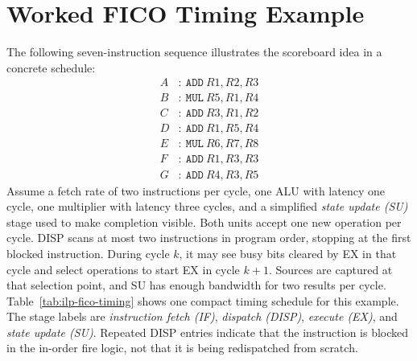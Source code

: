 \section{Worked FICO Timing Example}\label{sec:ilp-fico-example}
The following seven-instruction sequence illustrates the scoreboard idea in a concrete schedule:
\begin{align*}
    A&:\ \texttt{ADD}\ R1,R2,R3 \\
    B&:\ \texttt{MUL}\ R5,R1,R4 \\
    C&:\ \texttt{ADD}\ R3,R1,R2 \\
    D&:\ \texttt{ADD}\ R1,R5,R4 \\
    E&:\ \texttt{MUL}\ R6,R7,R8 \\
    F&:\ \texttt{ADD}\ R1,R3,R3 \\
    G&:\ \texttt{ADD}\ R4,R3,R5
\end{align*}
Assume a fetch rate of two instructions per cycle, one ALU with latency one cycle, one multiplier with latency three cycles, and a simplified \textit{state update (SU)} stage used to make completion visible.
Both units accept one new operation per cycle.
DISP scans at most two instructions in program order, stopping at the first blocked instruction.
During cycle $k$, it may see busy bits cleared by EX in that cycle and select operations to start EX in cycle $k+1$.
Sources are captured at that selection point, and SU has enough bandwidth for two results per cycle.
Table~\ref{tab:ilp-fico-timing} shows one compact timing schedule for this example.
The stage labels are \textit{instruction fetch (IF)}, \textit{dispatch (DISP)}, \textit{execute (EX)}, and \textit{state update (SU)}.
Repeated DISP entries indicate that the instruction is blocked in the in-order fire logic, not that it is being redispatched from scratch.

